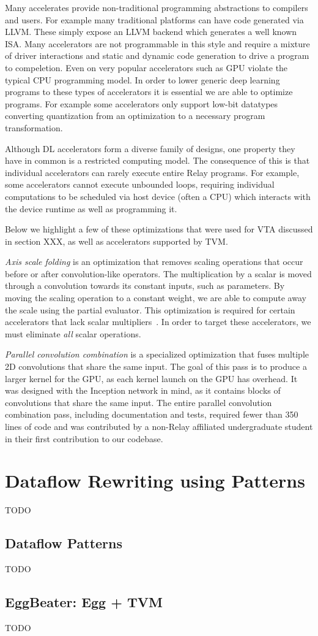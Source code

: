 Many accelerates provide non-traditional programming
    abstractions to compilers and users.
For example many traditional platforms can have
    code generated via LLVM.
These simply expose an LLVM backend which generates
    a well known ISA.
Many accelerators are not programmable in this style
    and require a mixture of driver interactions
    and static and dynamic code generation to
    drive a program to compeletion.
Even on very popular accelerators such as GPU
    violate the typical CPU programming model.
In order to lower generic deep learning programs
    to these types of accelerators it is
    essential we are able to optimize programs.
For example some accelerators only support
    low-bit datatypes converting quantization
    from an optimization to a necessary program
    transformation.

Although DL accelerators form a diverse family of designs,
  one property they have in common is a restricted computing model.
The consequence of this is that individual accelerators
  can rarely execute entire Relay programs.
For example, some accelerators cannot execute unbounded loops,
  requiring individual computations to be scheduled via
  host device (often a CPU) which interacts with the device runtime
  as well as programming it.

Below we highlight a few of these optimizations that were used for
VTA discussed in section XXX, as well as accelerators supported by
TVM.

\textit{Axis scale folding} is an optimization that removes scaling
  operations that occur before or after convolution-like operators.
The multiplication by a scalar is moved through a convolution towards
  its constant inputs, such as parameters.
By moving the scaling operation to a constant weight, we are able
  to compute away the scale using the partial evaluator.
This optimization is required for certain accelerators that lack scalar multipliers~\citep{moreau2018vta}.
In order to target these accelerators,
  we must eliminate \textit{all} scalar operations.

\textit{Parallel convolution combination} is a specialized
  optimization that fuses multiple 2D convolutions that share the same input.
The goal of this pass is to produce a larger kernel for the GPU,
  as each kernel launch on the GPU has overhead.
It was designed with the Inception network \citep{inception} in mind, as it
  contains blocks of convolutions that share the same input.
The entire parallel convolution combination pass,
  including documentation and tests,
  required fewer than 350 lines of code and was contributed
  by a non-Relay affiliated undergraduate student
  in their first contribution to our codebase.

\section{Dataflow Rewriting using Patterns}
TODO

\subsection{Dataflow Patterns}
TODO
\subsection{EggBeater: Egg + TVM}
TODO
